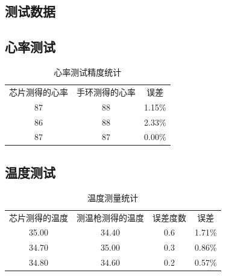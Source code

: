 \documentclass[scheme=chinese,a4paper]{article}
\begin{document}
\begin{appendices}
\section{测试数据}
\subsection{心率测试}
\begin{table}[H]
  \centering
    \begin{tabular}{ccc}
    \toprule
    \multirow{2}[2]{*}{芯片测得的心率} & \multirow{2}[2]{*}{手环测得的心率} & \multirow{2}[2]{*}{误差} \\
          &       &  \\
    \midrule
    87    & 88    & 1.15\% \\
    \midrule
    86    & 88    & 2.33\% \\
    \midrule
    87    & 87    & 0.00\% \\
    \bottomrule
    \end{tabular}%
  \caption{心率测试精度统计}
  \label{tab:addlabel}%
\end{table}%


\subsection{温度测试}
\begin{table}[H]
  \centering
    \begin{tabular}{cccc}
    \toprule
    \multirow{2}[2]{*}{芯片测得的温度} & \multirow{2}[2]{*}{测温枪测得的温度} & \multirow{2}[2]{*}{误差度数} & \multirow{2}[2]{*}{误差} \\
          &       &       &  \\
    \midrule
    35.00  & 34.40  & 0.6   & 1.71\% \\
    \midrule
    34.70  & 35.00  & 0.3   & 0.86\% \\
    \midrule
    34.80  & 34.60  & 0.2   & 0.57\% \\
    \bottomrule
    \end{tabular}%
  \caption{温度测量统计}
  \label{tab:addlabel}%
\end{table}%




\end{appendices}
\end{document}
